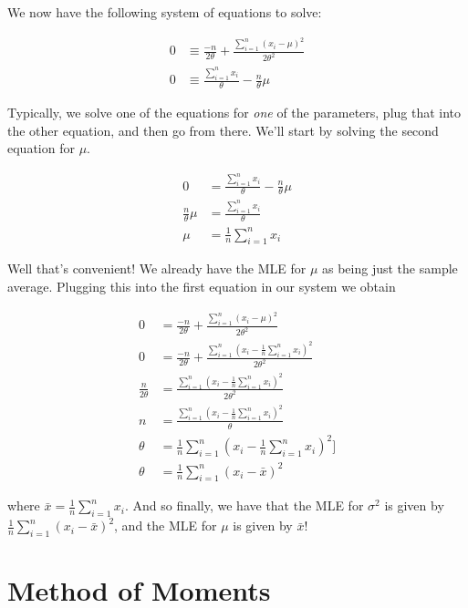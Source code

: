 \documentclass[
  letterpaper,
  DIV=11,
  numbers=noendperiod]{scrreprt}
\begin{document}
We now have the following system of equations to solve:

\begin{align*}
    0 & \equiv \frac{-n}{2 \theta} + \frac{\sum_{i = 1}^n (x_i - \mu)^2 }{2 \theta^2} \\
    0 & \equiv \frac{\sum_{i = 1}^n x_i}{\theta} - \frac{n}{\theta} \mu
\end{align*}

Typically, we solve one of the equations for \emph{one} of the
parameters, plug that into the other equation, and then go from there.
We'll start by solving the second equation for \(\mu\).

\begin{align*}
    0 & = \frac{\sum_{i = 1}^n x_i}{\theta} - \frac{n}{\theta} \mu \\
    \frac{n}{\theta} \mu & = \frac{\sum_{i = 1}^n x_i}{\theta} \\
    \mu & = \frac{1}{n} \sum_{i = 1}^n x_i
\end{align*}

Well that's convenient! We already have the MLE for \(\mu\) as being
just the sample average. Plugging this into the first equation in our
system we obtain

\begin{align*}
    0 & = \frac{-n}{2 \theta} + \frac{\sum_{i = 1}^n (x_i - \mu)^2 }{2 \theta^2} \\
    0 & = \frac{-n}{2 \theta} + \frac{\sum_{i = 1}^n (x_i - \frac{1}{n} \sum_{i = 1}^n x_i )^2 }{2 \theta^2} \\
    \frac{n}{2 \theta} & = \frac{\sum_{i = 1}^n (x_i - \frac{1}{n} \sum_{i = 1}^n x_i )^2 }{2 \theta^2} \\
    n & = \frac{\sum_{i = 1}^n (x_i - \frac{1}{n} \sum_{i = 1}^n x_i )^2 }{\theta} \\
    \theta & = \frac{1}{n} \sum_{i = 1}^n (x_i - \frac{1}{n} \sum_{i = 1}^n x_i )^2] \\
    \theta & = \frac{1}{n} \sum_{i = 1}^n (x_i - \bar{x} )^2
\end{align*}

where \(\bar{x} = \frac{1}{n} \sum_{i = 1}^n x_i\). And so finally, we
have that the MLE for \(\sigma^2\) is given by
\(\frac{1}{n} \sum_{i = 1}^n (x_i - \bar{x} )^2\), and the MLE for
\(\mu\) is given by \(\bar{x}\)!


\chapter{Method of Moments}\label{method-of-moments}
\end{document}
